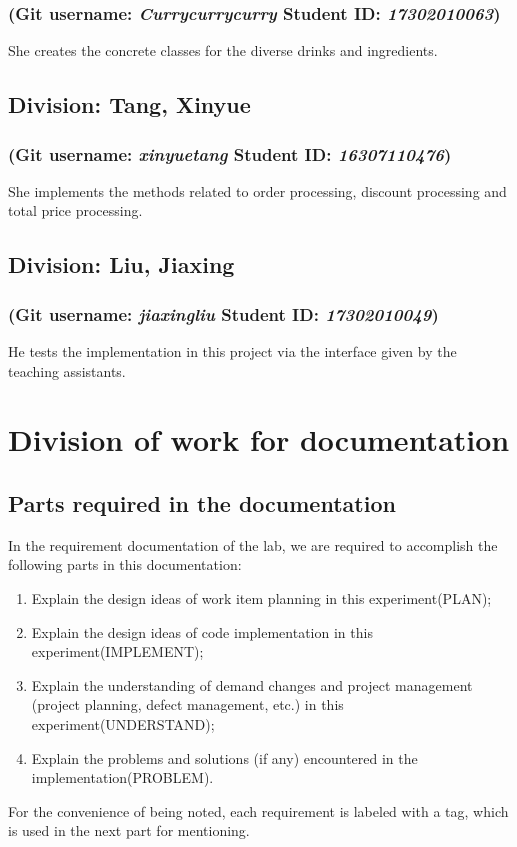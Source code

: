 \documentclass[a4paper]{report}
\begin{document}
\subsubsection{(Git username: \emph{Currycurrycurry} Student ID: \emph{17302010063})}
She creates the concrete classes for the diverse drinks and ingredients.

\subsection{Division: Tang, Xinyue}
\subsubsection{(Git username: \emph{xinyuetang} Student ID: \emph{16307110476})}
She implements the methods related to order processing, discount processing and total price processing.

\subsection{Division: Liu, Jiaxing}
\subsubsection{(Git username: \emph{jiaxingliu} Student ID: \emph{17302010049})}
He tests the implementation in this project via the interface given by the teaching assistants.
\section{Division of work for documentation}
\subsection{Parts required in the documentation}
In the requirement documentation of the lab, we are required to accomplish the following parts in this documentation:
\begin{enumerate}
\item Explain the design ideas of work item planning in this experiment(PLAN);
\item Explain the design ideas of code implementation in this experiment(IMPLEMENT);
\item Explain the understanding of demand changes and project management (project planning, defect management, etc.) in this experiment(UNDERSTAND);
\item Explain the problems and solutions (if any) encountered in the implementation(PROBLEM).
\end{enumerate}
For the convenience of being noted, each requirement is labeled with a tag, which is used in the next part for mentioning.
\end{document}
